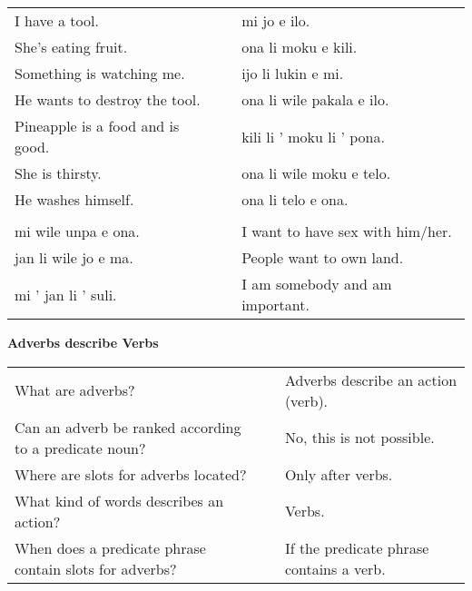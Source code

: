 \begin{supertabular}{p{5,5cm}|ll}
I have a tool. && mi jo e ilo. \\ %
She's eating fruit. && ona li moku e kili. \\ %
Something is watching me. && ijo li lukin e mi. \\ %
He wants to destroy the tool. && ona li wile pakala e ilo. \\ %
Pineapple is a food and is good. && kili li ' moku li ' pona. \\ %
She is thirsty. && ona li wile moku e telo. \\ %
He washes himself. && ona li telo e ona.  \\ %
 && \\ %
mi wile unpa e ona. && I want to have sex with him/her.  \\
jan li wile jo e ma. && People want to own land. \\
mi ' jan li ' suli. && I am somebody and am important. \\
\end{supertabular} 


\textbf{Adverbs describe Verbs} 
\label{'adverbs'}

\begin{supertabular}{p{5,5cm}|ll}
What are adverbs? && Adverbs describe an action (verb). \\ %
Can an adverb be ranked according to a predicate noun? && No, this is not possible.  \\ %
Where are slots for adverbs located? && Only after verbs. \\ %
What kind of words describes an action? && Verbs. \\ %
When does a predicate phrase contain slots for adverbs? && If the predicate phrase contains a verb. \\ %
\end{supertabular} 

